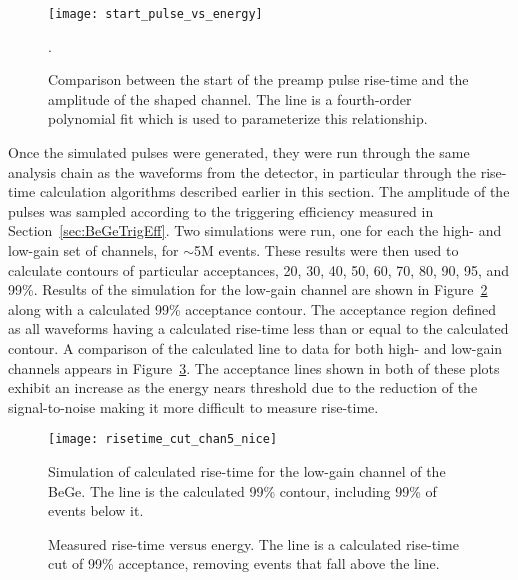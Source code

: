 					\begin{figure}
						\centering
						\texttt{[image: start\_pulse\_vs\_energy]}
						\caption[Comparison between the start of the preamp pulse rise-time and the amplitude of the shaped channel for the BeGe]
						{Comparison between the start of the preamp pulse rise-time and the amplitude of the shaped
						 channel.  The line is a fourth-order polynomial fit which is used to parameterize this relationship.}
						\label{fig:TriggerPositionDependence}.
					\end{figure}					
	
	Once the simulated pulses were generated, they were run through the same analysis chain as the waveforms from the detector, in particular through the rise-time calculation algorithms described earlier in this section.  The amplitude of the pulses was sampled according to the triggering efficiency measured in Section~\ref{sec:BeGeTrigEff}.  Two simulations were run, one for each the high- and low-gain set of channels, for $\sim$5M events.  These results were then used to calculate contours of particular acceptances, 20, 30, 40, 50, 60, 70, 80, 90, 95, and 99\%.  Results of the simulation for the low-gain channel are shown in Figure~\ref{fig:RisetimeSimulation} along with a calculated 99\% acceptance contour.  The acceptance region defined as all waveforms having a calculated rise-time less than or equal to the calculated contour.  A comparison of the calculated line to data for both high- and low-gain channels appears in Figure~\ref{fig:RisetimeDataVsCut}.  The acceptance lines shown in both of these plots exhibit an increase as the energy nears threshold due to the reduction of the signal-to-noise making it more difficult to measure rise-time.
					
				\begin{figure}
					\centering
					\texttt{[image: risetime\_cut\_chan5\_nice]}
					\caption[Simulation of calculated rise-time for the low-gain channel of the BeGe]
					{Simulation of calculated rise-time for the low-gain channel of the BeGe.  The line is the calculated 99\% contour, including 99\% of events below it.}
					\label{fig:RisetimeSimulation}
				\end{figure}	
	
				\begin{figure}
					\centering
					\def\plotwidth{0.8\textwidth}					
					\caption[Measured rise-time versus energy with a calculated rise-time cut of 99\% acceptance]
					{Measured rise-time versus energy.  The line is a calculated rise-time cut of 99\% acceptance, removing events that fall above the line.}
					\label{fig:RisetimeDataVsCut}
				\end{figure}	
	
